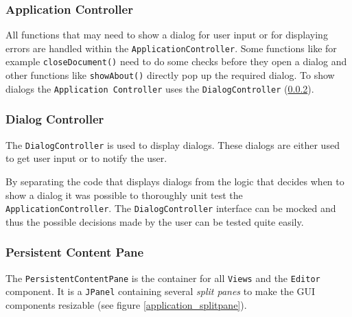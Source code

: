 

\subsubsection{Application Controller}
All functions that may need to show a dialog for user input or for displaying errors are handled within the \texttt{Application\-Controller}. Some functions like for example \texttt{closeDocument()} need to do some checks before they open a dialog and other functions like \texttt{showAbout()} directly pop up the required dialog. To show dialogs the \texttt{Application Controller} uses the \texttt{Dialog\-Controller} (\ref{applicationlayer_dialogcontroller}).

\subsubsection{Dialog Controller}
\label{applicationlayer_dialogcontroller}
The \texttt{Dialog\-Controller} is used to display dialogs. These dialogs are either used to get user input or to notify the user. 

By separating the code that displays dialogs from the logic that decides when
to show a dialog it was possible to thoroughly unit test the \texttt{Application\-Controller}. The \texttt{Dialog\-Controller} interface can be mocked and thus the possible decisions made by the user can be tested quite easily.



\subsubsection{Persistent Content Pane}
The \texttt{Persistent\-Content\-Pane} is the container for all \texttt{Views} and the \texttt{Editor} component. It is a \texttt{JPanel} containing several \emph{split panes} to make the GUI components resizable (see figure \ref{application_splitpane}).

